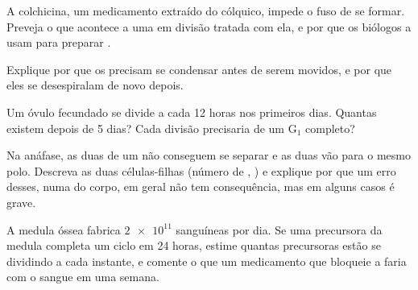 \begin{exercise}[$\star\star$]\label{exo:g11:cell-cycle-mitosis:9}
A colchicina, um medicamento extraído do cólquico, impede o fuso de se
formar. Preveja o que acontece a uma  em divisão tratada com ela,
e por que os biólogos a usam para preparar .
\end{exercise}

\begin{exercise}[$\star\star$]\label{exo:g11:cell-cycle-mitosis:10}
Explique por que os  precisam se condensar antes de serem
movidos, e por que eles se desespiralam de novo depois.
\end{exercise}

\begin{exercise}[$\star\star$]\label{exo:g11:cell-cycle-mitosis:11}
Um óvulo fecundado se divide a cada 12 horas nos primeiros dias.
Quantas  existem depois de 5 dias? Cada divisão precisaria de um
$\mathrm{G_1}$ completo?
\end{exercise}

\begin{exercise}[$\star\star\star$]\label{exo:g11:cell-cycle-mitosis:12}
Na anáfase, as duas  de um  não conseguem se
separar e as duas vão para o mesmo polo. Descreva as duas células-filhas
(número de , ) e explique por que um erro desses, numa
 do corpo, em geral não tem consequência, mas em alguns casos é
grave.
\end{exercise}

\begin{exercise}[$\star\star\star$]\label{exo:g11:cell-cycle-mitosis:13}
A medula óssea fabrica $\num{2e11}$  sanguíneas por dia. Se uma
 precursora da medula completa um ciclo em 24 horas, estime
quantas precursoras estão se dividindo a cada instante, e comente o que
um medicamento que bloqueie a  faria com o sangue em uma semana.
\end{exercise}

